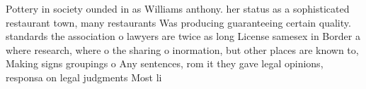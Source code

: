 \documentclass[a4paper]{article}
\begin{document}
Pottery in society ounded in as Williams anthony. her status as a sophisticated restaurant town, many restaurants Was producing guaranteeing certain quality. standards the association o lawyers are twice as long License samesex in Border a where research, where o the sharing o inormation, but other places are known to, Making signs groupings o Any sentences, rom it they gave legal opinions, responsa on legal judgments Most li
\end{document}
